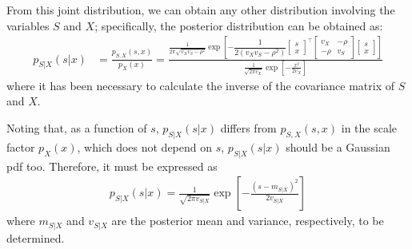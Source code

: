 From this joint distribution, we can obtain any other distribution involving the variables $S$ and $X$; specifically, the posterior distribution can be obtained as:
\begin{align}
\label{Est_psxgauss}
p_{S|X}(s|x) 
	&= \frac{p_{S,X}(s,x)}{p_X(x)} 
	 = \frac{\frac{1}{2\pi \sqrt{v_X v_S - \rho^2}}
	         \exp\left[-\dfrac{1}{2(v_X v_S - \rho^2)} 
	         			\begin{bmatrix} s \\ x \end{bmatrix}^\intercal
	                    \begin{bmatrix} v_X & -\rho \\ -\rho & v_S \end{bmatrix} 
	                    \begin{bmatrix} s \\ x \end{bmatrix}\right]}
	        {\frac{1}{\sqrt{2\pi v_X}} \exp\left[-\frac{x^2}{2 v_X}\right]}
\end{align}
where it has been necessary to calculate the inverse of the covariance matrix of $S$ and $X$. 

{Noting that, as a function of $s$, $p_{S|X}(s|x)$ differs from $p_{S,X}(s,x)$ in the scale factor $p_X(x)$, which does not depend on $s$,  $p_{S|X}(s|x)$ should be a Gaussian pdf too. Therefore, it must be expressed as
\begin{align}
\label{Est_postsxgauss}
p_{S|X}(s|x) = \frac{1}{\sqrt{2\pi v_{S|X}}} \exp\left[ -\frac{(s - m_{S|X})^2}{2 v_{S|X}}\right] 
\end{align}
where $m_{S|X}$ and $v_{S|X}$ are the posterior mean and variance, respectively, to be determined.}

